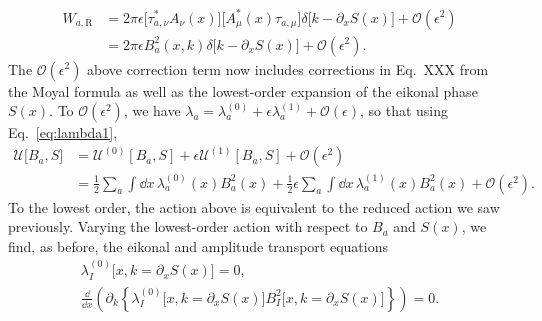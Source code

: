 %
\begin{equation}
  \begin{aligned}
    W_{a,\text{R}} &= 2\pi \epsilon\big[\tau_{a,\nu}^{*} A_{\nu}(x)\big]\big[A^{*}_{\mu}(x)\tau_{a,\mu}\big]\delta\big[k - \partial_{x}S(x)\big] + \mathcal{O}(\epsilon^{2})\\
                   &= 2\pi\epsilon {B^{2}_{a}}(x, k)\delta\big[k - \partial_{x}S(x)\big] + \mathcal{O}(\epsilon^{2}).
  \end{aligned}
\end{equation}
%
The $\mathcal{O}(\epsilon^{2})$ above correction term now includes corrections in Eq.~XXX from the Moyal formula as well as the lowest-order expansion of the eikonal phase $S(x)$.
To $\mathcal{O}(\epsilon^{2})$, we have $\lambda_{a} = \lambda_{a}^{(0)} + \epsilon\lambda_{a}^{(1)} + \mathcal{O}(\epsilon)$, so that using Eq.~\eqref{eq:lambda1},
%
\begin{equation}
  \begin{aligned}
    \mathscr{U}\big[B_{a}, S\big] &= \mathscr{U}^{(0)}\left[B_{a}, S\right] + \epsilon\mathscr{U}^{(1)}\left[B_{a}, S\right] + \mathcal{O}(\epsilon^{2})\\
                                  &= \tfrac{1}{2} \sum_{a} \int \dd{x}\, \lambda_{a}^{(0)}(x)B^{2}_{a}(x) + \tfrac{1}{2}\epsilon\sum_{a}\int\dd{x}\,\lambda_{a}^{(1)}(x)B^{2}_{a}(x) + \mathcal{O}(\epsilon^{2}).
  \end{aligned}
\end{equation}
%
To the lowest order, the action above is equivalent to the reduced action we saw previously.
Varying the lowest-order action with respect to $B_{a}$ and $S(x)$, we find, as before, the eikonal and amplitude transport equations
%
\begin{equation}
  \begin{gathered}
    \lambda_{I}^{(0)}\big[x, k=\partial_{x}S(x)\big] = 0,\\
\frac{\dd}{\dd{x}}\left(\partial_{k}\left\{\lambda_{I}^{(0)}\big[x, k=\partial_{x}S(x)\big]B^{2}_{I}\big[x, k=\partial_{x}S(x)\big]\right\}\right) = 0.
  \end{gathered}
\end{equation}
%

